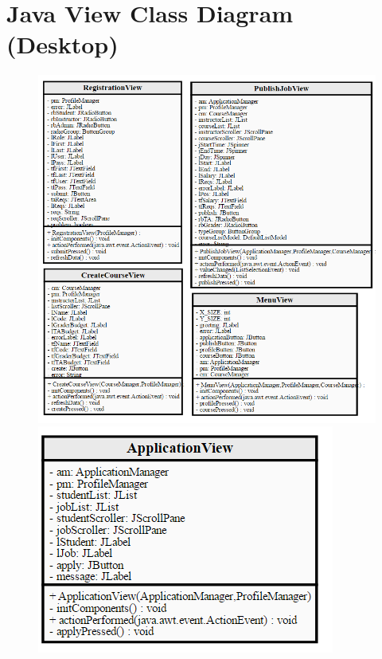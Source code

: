 \documentclass[12pt]{report}
\begin{document}
\section{Java View Class Diagram (Desktop)}
\begin{figure}[H]
	\centering
	\includegraphics[scale=1]{./Design/ClassDiagrams/desktopViewPackageDiagram(A)}
	\includegraphics[scale=1]{./Design/ClassDiagrams/desktopViewPackageDiagram(B)}
\end{figure}
\end{document}
